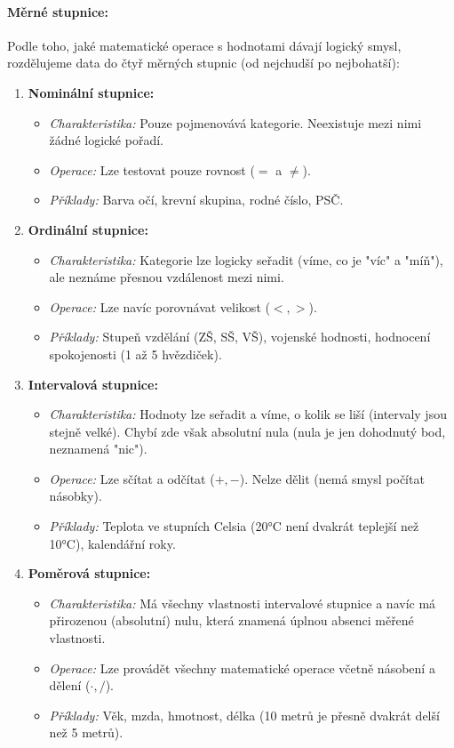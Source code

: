 \paragraph*{Měrné stupnice:}
Podle toho, jaké matematické operace s hodnotami dávají logický smysl, rozdělujeme data do čtyř měrných stupnic (od nejchudší po nejbohatší):

\begin{enumerate}
    \item \textbf{Nominální stupnice:}
    \begin{itemize}
        \item \textit{Charakteristika:} Pouze pojmenovává kategorie. Neexistuje mezi nimi žádné logické pořadí.
        \item \textit{Operace:} Lze testovat pouze rovnost ($=$ a $\neq$).
        \item \textit{Příklady:} Barva očí, krevní skupina, rodné číslo, PSČ.
    \end{itemize}
    
    \item \textbf{Ordinální stupnice:}
    \begin{itemize}
        \item \textit{Charakteristika:} Kategorie lze logicky seřadit (víme, co je "víc" a "míň"), ale neznáme přesnou vzdálenost mezi nimi.
        \item \textit{Operace:} Lze navíc porovnávat velikost ($<, >$).
        \item \textit{Příklady:} Stupeň vzdělání (ZŠ, SŠ, VŠ), vojenské hodnosti, hodnocení spokojenosti (1 až 5 hvězdiček).
    \end{itemize}
    
    \item \textbf{Intervalová stupnice:}
    \begin{itemize}
        \item \textit{Charakteristika:} Hodnoty lze seřadit a víme, o kolik se liší (intervaly jsou stejně velké). Chybí zde však absolutní nula (nula je jen dohodnutý bod, neznamená "nic").
        \item \textit{Operace:} Lze sčítat a odčítat ($+, -$). Nelze dělit (nemá smysl počítat násobky).
        \item \textit{Příklady:} Teplota ve stupních Celsia (20°C není dvakrát teplejší než 10°C), kalendářní roky.
    \end{itemize}
    
    \item \textbf{Poměrová stupnice:}
    \begin{itemize}
        \item \textit{Charakteristika:} Má všechny vlastnosti intervalové stupnice a navíc má přirozenou (absolutní) nulu, která znamená úplnou absenci měřené vlastnosti.
        \item \textit{Operace:} Lze provádět všechny matematické operace včetně násobení a dělení ($\cdot, /$).
        \item \textit{Příklady:} Věk, mzda, hmotnost, délka (10 metrů je přesně dvakrát delší než 5 metrů).
    \end{itemize}
\end{enumerate}


